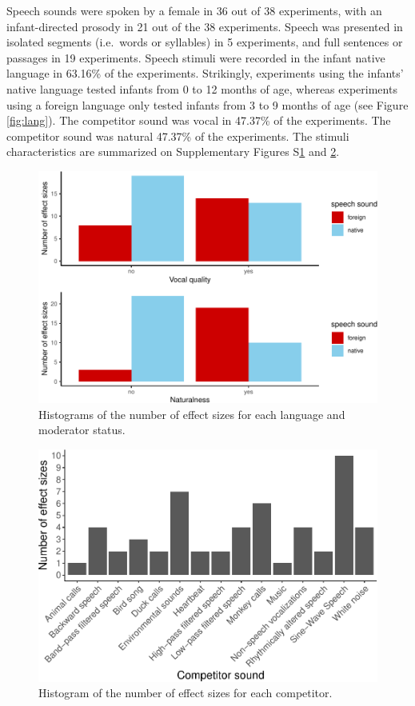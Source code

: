\documentclass[
  man]{apa6}
\begin{document}
Speech sounds were spoken by a female in 36 out of 38 experiments, with an infant-directed prosody in 21 out of the 38 experiments. Speech was presented in isolated segments (i.e.~words or syllables) in 5 experiments, and full sentences or passages in 19 experiments. Speech stimuli were recorded in the infant native language in 63.16\% of the experiments. Strikingly, experiments using the infants' native language tested infants from 0 to 12 months of age, whereas experiments using a foreign language only tested infants from 3 to 9 months of age (see Figure \ref{fig:lang}).
The competitor sound was vocal in 47.37\% of the experiments. The competitor sound was natural 47.37\% of the experiments.
The stimuli characteristics are summarized on Supplementary Figures S\ref{fig:stimuli} and \ref{fig:competitors}.

\begin{figure}
\centering
\includegraphics{MA_speech_pref_files/figure-latex/stimuli-1.pdf}
\caption{\label{fig:stimuli}Histograms of the number of effect sizes for each language and moderator status.}
\end{figure}

\begin{figure}
\centering
\includegraphics{MA_speech_pref_files/figure-latex/competitors-1.pdf}
\caption{\label{fig:competitors}Histogram of the number of effect sizes for each competitor.}
\end{figure}
\end{document}
